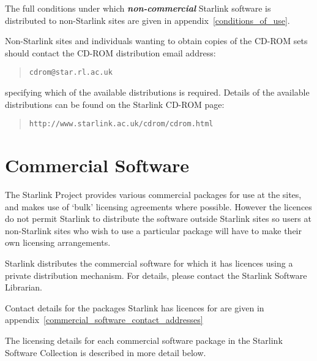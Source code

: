 \documentclass[twoside,11pt]{article}
\newcommand{\htmladdnormallink}[2]{#1}
\newcommand{\htmlref}[2]{#1}
\newcommand{\latexhtml}[2]{#1}
\newcommand{\xlabel}[1]{}
\renewcommand{\_}{\texttt{\symbol{95}}}
\begin{document}
The full conditions under which \textbf{\textit{non-commercial\/}}
Starlink software is distributed to non-Starlink sites are given in
\latexhtml{appendix~\ref{conditions_of_use}.}{the \htmlref{Conditions
of Use}{conditions_of_use} section.}

Non-Starlink sites and individuals wanting to obtain copies of the CD-ROM
sets should contact the CD-ROM distribution email address:

\begin{quote}
\htmladdnormallink{\texttt{cdrom@star.rl.ac.uk}}{mailto:cdrom@star.rl.ac.uk}
\end{quote}

specifying which of the available distributions is required.  Details
of the available distributions can be found on the Starlink CD-ROM
page:

\begin{quote}
\htmladdnormallink{\texttt{http://www.starlink.ac.uk/cdrom/cdrom.html}}{http://www.starlink.ac.uk/cdrom/cdrom.html}
\end{quote}

\section{\xlabel{commercial_software}Commercial Software}
\label{commercial_software}

The Starlink Project provides various commercial packages for use at the
sites, and makes use of `bulk' licensing agreements where possible.
However the licences do not permit Starlink to distribute the software 
outside Starlink sites so users at non-Starlink sites who wish to use a
particular package will have to make their own licensing arrangements.

Starlink distributes the commercial software for which it has licences 
using a private distribution mechanism.  For details, please contact the 
Starlink Software Librarian.

Contact details for the packages Starlink has licences for are given in 
\latexhtml{appendix~\ref{commercial_software_contact_addresses}}{the 
\htmlref{Commercial software contact addresses}{commercial_software_contact_addresses} 
section.}

The licensing details for each commercial software package in the Starlink
Software Collection is described in more detail below.
\end{document}

